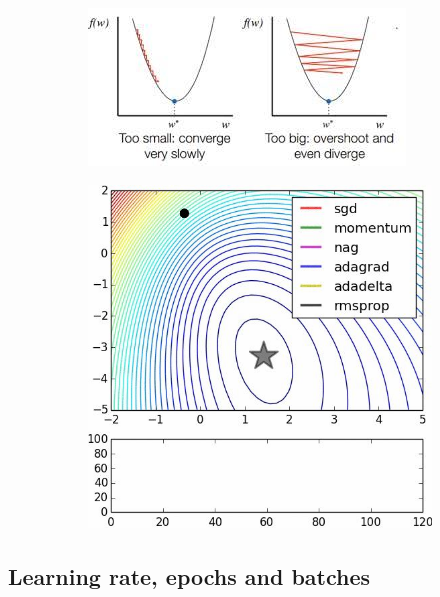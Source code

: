 \begin{figure}[ht]
	\centering
	\begin{subfigure}{.5\textwidth}
		\centering
		\includegraphics[width=1\linewidth]{figure_ml/sgd.png}
	\end{subfigure}%
	\begin{subfigure}{.4\textwidth}
		\centering
		\includegraphics[width=1\linewidth]{figure_ml/sgd2.png}
	\end{subfigure}
\end{figure}



\subsection{Learning rate, epochs and batches}


